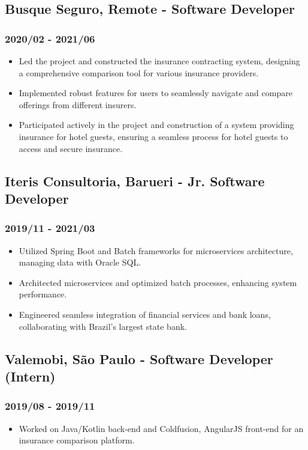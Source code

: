 \documentclass[a4paper,10pt]{article}
\begin{document}
\subsection*{Busque Seguro, Remote - Software Developer}
\subsubsection*{2020/02 - 2021/06}
\begin{itemize}
    \item Led the project and constructed the insurance contracting system, designing a comprehensive comparison tool for various insurance providers.
    \item Implemented robust features for users to seamlessly navigate and compare offerings from different insurers.
    \item Participated actively in the project and construction of a system providing insurance for hotel guests, ensuring a seamless process for hotel guests to access and secure insurance.
\end{itemize}

\subsection*{Iteris Consultoria, Barueri - Jr. Software Developer}
\subsubsection*{2019/11 - 2021/03}
\begin{itemize}
    \item Utilized Spring Boot and Batch frameworks for microservices architecture, managing data with Oracle SQL.
    \item Architected microservices and optimized batch processes, enhancing system performance.
    \item Engineered seamless integration of financial services and bank loans, collaborating with Brazil's largest state bank.
\end{itemize}

\subsection*{Valemobi, São Paulo - Software Developer (Intern)}
\subsubsection*{2019/08 - 2019/11}
\begin{itemize}
    \item Worked on Java/Kotlin back-end and Coldfusion, AngularJS front-end for an insurance comparison platform.
\end{itemize}
\end{document}
